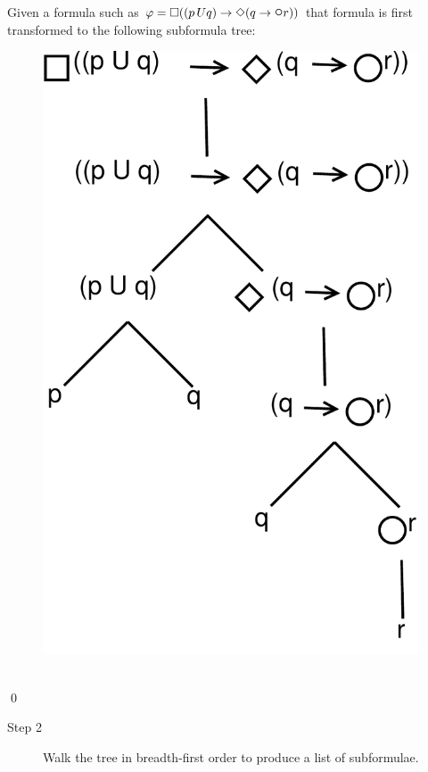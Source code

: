 \begin{myEx}
Given a formula such as	$ \varphi = \LTLalways((p \,U q) \rightarrow \LTLeventually(q \rightarrow \LTLnext r)) $ that formula is first transformed to the following subformula tree:\\
\begin{figure}[h]
\centering
\includegraphics[height=0.3\textheight]{graphics/SubformulaTree}
\label{fig:subformulaTree}
\end{figure}
\\
\qed
\end{myEx}

\begin{description}
\item[Step 2] Walk the tree in breadth-first order to produce a list of subformulae.
\end{description}

